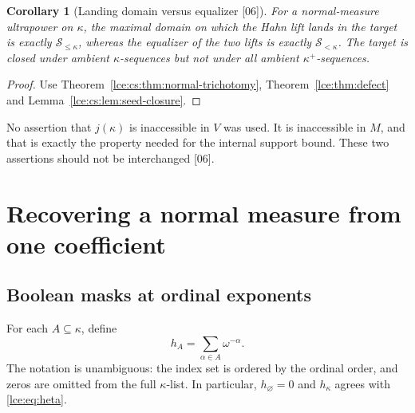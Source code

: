 \documentclass[11pt,letterpaper]{article}
\numberwithin{equation}{section}
\newtheorem{corollary}[theorem]{Corollary}
\theoremstyle{definition}
\theoremstyle{remark}
\newcommand{\Sk}{\mathscr S_{<\kappa}}
\newcommand{\thref}[1]{Theorem~\ref{#1}}
\newcommand{\leref}[1]{Lemma~\ref{#1}}
\newcommand{\src}[1]{\textup{\textsf{\small[#1]}}}%
\newcommand{\Skle}{\mathscr S_{\le\kappa}}
\begin{document}
\begin{corollary}[Landing domain versus equalizer \src{06}]\label{lce:cs:cor:landing-domain}
For a normal-measure ultrapower on $\kappa$, the maximal domain on which the
Hahn lift lands in the target is exactly $\Skle$, whereas the equalizer of
the two lifts is exactly $\Sk$. The target is closed under ambient
$\kappa$-sequences but not under all ambient $\kappa^+$-sequences.
\end{corollary}
\begin{proof}
Use \thref{lce:cs:thm:normal-trichotomy}, \thref{lce:thm:defect} and
\leref{lce:cs:lem:seed-closure}.
\end{proof}
No assertion that $j(\kappa)$ is inaccessible in $V$ was used. It is
inaccessible in $M$, and that is exactly the property needed for the
internal support bound. These two assertions should not be interchanged
\src{06}.

\section{Recovering a normal measure from one coefficient}\label{lce:sec:measure}

\subsection{Boolean masks at ordinal exponents}
For each $A\subseteq\kappa$, define
\begin{equation}\label{lce:eq:maskA}
 h_A=\sum_{\alpha\in A}\omega^{-\alpha}.
\end{equation}
The notation is unambiguous: the index set is ordered by the ordinal order,
and zeros are omitted from the full $\kappa$-list. In particular,
$h_\varnothing=0$ and $h_\kappa$ agrees with \eqref{lce:eq:heta}.
\end{document}

